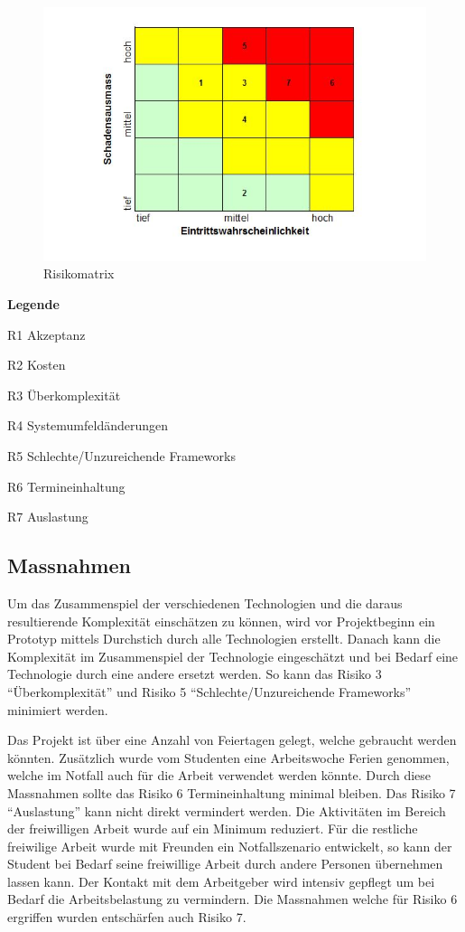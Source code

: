 \begin{figure}[htbp]
\centering
\includegraphics{images/excel-statistik/risikomatrix.JPG}
\caption[Risikomatrix ]{Risikomatrix \footnotemark{}}
\end{figure}

\textbf{Legende}

R1 Akzeptanz

R2 Kosten

R3 Überkomplexität

R4 Systemumfeldänderungen

R5 Schlechte/Unzureichende Frameworks

R6 Termineinhaltung

R7 Auslastung

\subsection{Massnahmen}\label{massnahmen}

Um das Zusammenspiel der verschiedenen Technologien und die daraus
resultierende Komplexität einschätzen zu können, wird vor Projektbeginn
ein Prototyp mittels Durchstich durch alle Technologien erstellt. Danach
kann die Komplexität im Zusammenspiel der Technologie eingeschätzt und
bei Bedarf eine Technologie durch eine andere ersetzt werden. So kann
das Risiko 3 ``Überkomplexität'' und Risiko 5 ``Schlechte/Unzureichende
Frameworks'' minimiert werden.

Das Projekt ist über eine Anzahl von Feiertagen gelegt, welche gebraucht
werden könnten. Zusätzlich wurde vom Studenten eine Arbeitswoche Ferien
genommen, welche im Notfall auch für die Arbeit verwendet werden könnte.
Durch diese Massnahmen sollte das Risiko 6 Termineinhaltung minimal
bleiben. Das Risiko 7 ``Auslastung'' kann nicht direkt vermindert
werden. Die Aktivitäten im Bereich der freiwilligen Arbeit wurde auf ein
Minimum reduziert. Für die restliche freiwilige Arbeit wurde mit
Freunden ein Notfallszenario entwickelt, so kann der Student bei Bedarf
seine freiwillige Arbeit durch andere Personen übernehmen lassen kann.
Der Kontakt mit dem Arbeitgeber wird intensiv gepflegt um bei Bedarf die
Arbeitsbelastung zu vermindern. Die Massnahmen welche für Risiko 6
ergriffen wurden entschärfen auch Risiko 7.

